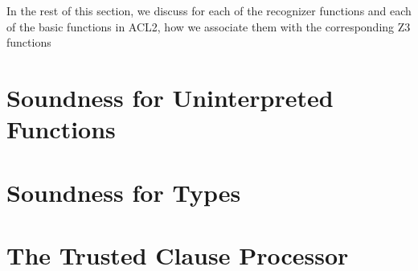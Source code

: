 In the rest of this section, we discuss for each of the recognizer functions and
each of the basic functions in ACL2, how we associate them with the
corresponding Z3 functions

\section{Soundness for Uninterpreted Functions}\label{sec:SoundUninterpreted}

\section{Soundness for Types}\label{sec:SoundType}

\section{The Trusted Clause Processor}\label{sec:SoundTrusted}

\endinput

\subsection{Booleans, Integers, Rationals, and Reals}\label{sec:reals}
If a term is a boolean constant, then the translation to the SMT solver is direct.
Likewise, if $x_i$ is free in $\Gtcp$ and \texttt{(booleanp $x_i$)}
is one of the hypotheses of $\Gtcp$, then $\Gtcp$ holds trivially in the case that
$x_i \not\in \{\texttt{t},\,\texttt{nil}\}$.  Thus, in $\Gsmt$ \smtlink{} can
represent the hypothesis \texttt{(booleanp $x_i$)} with the declaration\\
\rule{2em}{0ex}\texttt{x\_i = Bool('x\_i')}\\
without excluding any satisfying assignments.  We assume that the boolean operations
of the SMT solver (e.g. \texttt{And}, \texttt{Or}, \texttt{Not}) correspond
exactly to their ACL2 equivalents when their arguments are boolean.  If a boolean
operator is applied to a non-boolean value, then Z3 throws an exception, and we
regard $G$ as non-translatable.


